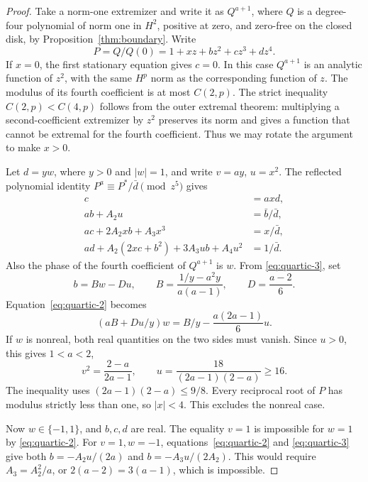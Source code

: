 \documentclass[11pt]{article}
\begin{document}
\begin{proof}
Take a norm-one extremizer and write it as \(Q^{a+1}\), where \(Q\) is
a degree-four polynomial of norm one in \(H^2\), positive at zero,
and zero-free on the closed disk, by Proposition~\ref{thm:boundary}.
Write
\[
 P=Q/Q(0)=1+xz+bz^2+cz^3+dz^4.
\]
If \(x=0\), the first stationary equation gives \(c=0\).
In this case \(Q^{a+1}\) is an analytic function of \(z^2\),
with the same \(H^p\) norm as the corresponding function of \(z\).
The modulus of its fourth coefficient is at most \(C(2,p)\). The strict inequality
\(C(2,p)<C(4,p)\) follows from the outer extremal theorem:
multiplying a second-coefficient extremizer by \(z^2\) preserves
its norm and gives a function that cannot be extremal for the
fourth coefficient. Thus we may rotate the argument to make \(x>0\).

Let \(d=yw\), where \(y>0\) and \(|w|=1\), and write \(v=ay\),
\(u=x^2\). The reflected polynomial identity
\(P^a\equiv P^*/\bar d\pmod{z^5}\) gives
\begin{align}
 c&=axd,\label{eq:quartic-1}\\
 a b+A_2u&=\bar b/\bar d,\label{eq:quartic-2}\\
 ac+2A_2xb+A_3x^3&=x/\bar d,\label{eq:quartic-3}\\
 ad+A_2(2xc+b^2)+3A_3ub+A_4u^2&=1/\bar d.\label{eq:quartic-4}
\end{align}
Also the phase of the fourth coefficient of \(Q^{a+1}\) is \(w\).
From \eqref{eq:quartic-3}, set
\[
 b=Bw-Du,\qquad B=\frac{1/y-a^2y}{a(a-1)},\qquad
 D=\frac{a-2}{6}.
\]
Equation~\eqref{eq:quartic-2} becomes
\[
 (aB+Du/y)w=B/y-\frac{a(2a-1)}6u .
\]
If \(w\) is nonreal, both real quantities on the two sides must
vanish. Since \(u>0\), this gives \(1<a<2\),
\[
 v^2=\frac{2-a}{2a-1},\qquad
 u=\frac{18}{(2a-1)(2-a)}\ge16.
\]
The inequality uses \((2a-1)(2-a)\le9/8\).
Every reciprocal root of \(P\) has modulus strictly less than one,
so \(|x|<4\). This excludes the nonreal case.

Now \(w\in\{-1,1\}\), and \(b,c,d\) are real. The equality \(v=1\)
is impossible for \(w=1\) by \eqref{eq:quartic-2}.
For \(v=1,w=-1\), equations~\eqref{eq:quartic-2} and
\eqref{eq:quartic-3} give both \(b=-A_2u/(2a)\) and
\(b=-A_3u/(2A_2)\). This would require
\(A_3=A_2^2/a\), or \(2(a-2)=3(a-1)\), which is impossible.


\end{proof}
\end{document}
